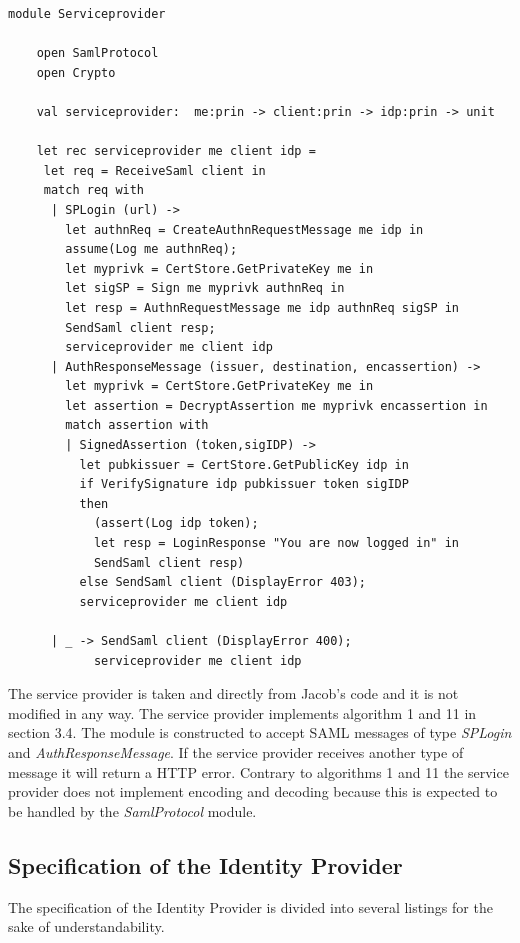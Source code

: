 \documentclass[twosided]{report}
\begin{document}
\begin{lstlisting}[style=fstar, caption={Specification of service provider}]
	module Serviceprovider
	
	open SamlProtocol
	open Crypto
	
	val serviceprovider:  me:prin -> client:prin -> idp:prin -> unit
	
	let rec serviceprovider me client idp = 
	 let req = ReceiveSaml client in
	 match req with
	  | SPLogin (url) ->
	    let authnReq = CreateAuthnRequestMessage me idp in
	    assume(Log me authnReq);
	    let myprivk = CertStore.GetPrivateKey me in
	    let sigSP = Sign me myprivk authnReq in
	    let resp = AuthnRequestMessage me idp authnReq sigSP in 
	    SendSaml client resp;
	    serviceprovider me client idp
	  | AuthResponseMessage (issuer, destination, encassertion) -> 
	    let myprivk = CertStore.GetPrivateKey me in
	    let assertion = DecryptAssertion me myprivk encassertion in
	    match assertion with
	    | SignedAssertion (token,sigIDP) ->
	      let pubkissuer = CertStore.GetPublicKey idp in
	      if VerifySignature idp pubkissuer token sigIDP
	      then
	        (assert(Log idp token);
	        let resp = LoginResponse "You are now logged in" in
	        SendSaml client resp)
	      else SendSaml client (DisplayError 403);
	      serviceprovider me client idp
	  
	  | _ -> SendSaml client (DisplayError 400);
	        serviceprovider me client idp
\end{lstlisting}
The service provider is taken and directly from Jacob's code and it is not modified in any way. The service provider implements algorithm 1 and 11 in section 3.4. The module is constructed to accept SAML messages of type \emph{SPLogin} and \emph{AuthResponseMessage}. If the service provider receives another type of message it will return a HTTP error. Contrary to algorithms 1 and 11 the service provider does not implement encoding and decoding because this is expected to be handled by the \emph{SamlProtocol} module.
\subsection{Specification of the Identity Provider}
The specification of the Identity Provider is divided into several listings for the sake of understandability.
\end{document}
